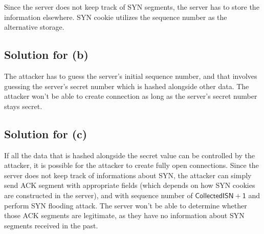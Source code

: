 \documentclass{scrartcl}
\begin{document}
Since the server does not keep track of SYN segments, the server has to store
the information elsewhere. SYN cookie utilizes the sequence number as the
alternative storage.

\subsection{Solution for (b)}

The attacker has to guess the server's initial sequence number, and that
involves guessing the server's secret number which is hashed alongside other
data. The attacker won't be able to create connection as long as the server's
secret number stays secret.

\subsection{Solution for (c)}

If all the data that is hashed alongside the secret value can be controlled by
the attacker, it is possible for the attacker to create fully open connections.
Since the server does not keep track of informations about SYN, the attacker
can simply send ACK segment with appropriate fields (which depends on how
SYN cookies are constructed in the server), and with sequence number of
\(\mathsf{CollectedISN + 1}\) and perform SYN flooding attack. The server won't
be able to determine whether those ACK segments are legitimate, as they have no
information about SYN segments received in the past.
\end{document}
